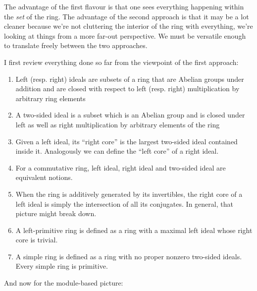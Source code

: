 \documentclass[a4paper]{amsart}
\begin{document}
The advantage of the first flavour is that one sees everything
happening within the {\em set} of the ring. The advantage of the
second approach is that it may be a lot cleaner because we're not
cluttering the interior of the ring with everything, we're looking at
things from a more far-out perspective. We must be versatile enough to
translate freely between the two approaches.

I first review everything done so far from the viewpoint of the first
approach:

\begin{enumerate}

\item Left (resp. right) ideals are subsets of a ring that are Abelian
  groups under addition and are closed with respect to left
  (resp. right) multiplication by arbitrary ring elements

\item A two-sided ideal is a subset which is an Abelian group and is
  closed under left as well as right multiplication by arbitrary
  elements of the ring

\item Given a left ideal, its ``right core'' is the largest two-sided
  ideal contained inside it. Analogously we can define the ``left
  core'' of a right ideal.

\item For a commutative ring, left ideal, right ideal and two-sided
  ideal are equivalent notions.

\item When the ring is additively generated by its invertibles, the
  right core of a left ideal is simply the intersection of all its
  conjugates. In general, that picture might break down.

\item A left-primitive ring is defined as a ring with a maximal left ideal
  whose right core is trivial.

\item A simple ring is defined as a ring with no proper nonzero
  two-sided ideals. Every simple ring is primitive.
\end{enumerate}

And now for the module-based picture:
\end{document}
